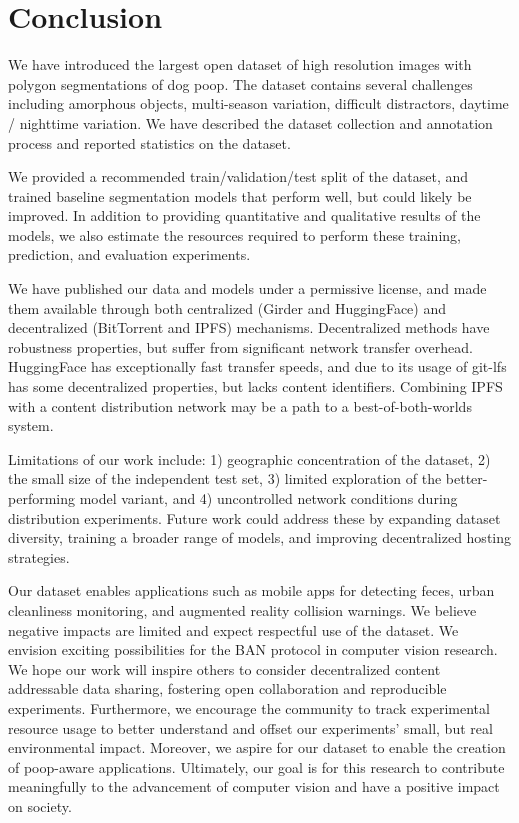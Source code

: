 \section{Conclusion}

We have introduced the largest open dataset of high resolution images with polygon
  segmentations of dog poop.
The dataset contains several challenges including amorphous objects, multi-season variation, difficult
  distractors, daytime / nighttime variation.
We have described the dataset collection and annotation process and reported statistics on the dataset.

We provided a recommended train/validation/test split of the dataset, and trained baseline segmentation
  models that perform well, but could likely be improved.
In addition to providing quantitative and qualitative results of the models, we also estimate the resources
  required to perform these training, prediction, and evaluation experiments.

We have published our data and models under a permissive license, and made them available through both
  centralized (Girder and HuggingFace) and decentralized (BitTorrent and IPFS) mechanisms.
Decentralized methods have robustness properties, but suffer from significant network transfer overhead.
HuggingFace has exceptionally fast transfer speeds, and due to its usage of git-lfs has some decentralized
  properties, but lacks content identifiers.
Combining IPFS with a content distribution network may be a path to a best-of-both-worlds system.


Limitations of our work include:
1) geographic concentration of the dataset,
2) the small size of the independent test set,
3) limited exploration of the better-performing model variant, and
4) uncontrolled network conditions during distribution experiments.
Future work could address these by expanding dataset diversity, training a
broader range of models, and improving decentralized hosting strategies.

Our dataset enables applications such as mobile apps for detecting feces, urban
cleanliness monitoring, and augmented reality collision warnings. We believe
negative impacts are limited and expect respectful use of the dataset.
We envision exciting possibilities for the BAN protocol in computer vision research.
We hope our work will inspire others to consider decentralized content addressable data sharing, fostering
  open collaboration and reproducible experiments.
Furthermore, we encourage the community to track experimental resource usage to better understand and offset
  our experiments' small, but real environmental impact.
Moreover, we aspire for our dataset to enable the creation of poop-aware applications.
Ultimately, our goal is for this research to contribute meaningfully to the advancement of computer vision
  and have a positive impact on society.
  


